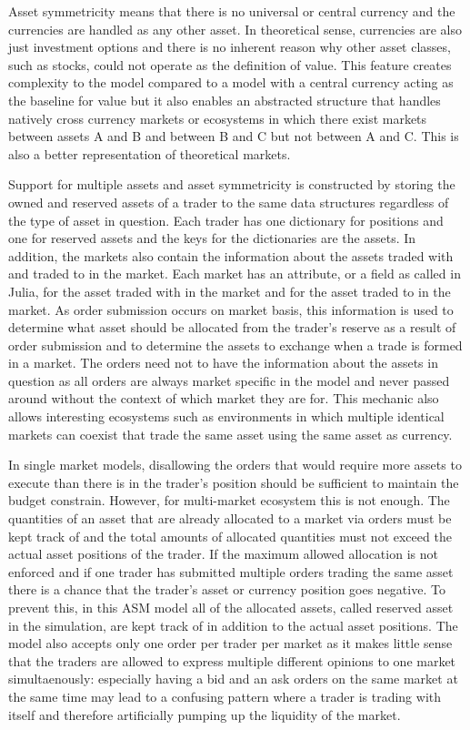 Asset symmetricity means that there is no universal or central currency 
and the currencies are handled as any other asset. In theoretical sense, 
currencies are also just investment options and there is no inherent reason why other 
asset classes, such as stocks, could not operate as the definition 
of value. This feature creates complexity to the model compared to a model
with a central currency acting as the baseline for value but it also enables an
abstracted structure that handles natively cross currency
markets or ecosystems in which there exist markets between assets A and 
B and between B and C but not between A and C. This is also a better 
representation of theoretical markets.

Support for multiple assets and asset symmetricity is constructed by storing 
the owned and reserved assets of a trader to the same data structures regardless
of the type of asset in question. Each trader has one dictionary for positions 
and one for reserved assets and the keys for the dictionaries are the assets. 
In addition, the markets also contain the information about the assets traded with and traded to 
in the market. Each market has an attribute, or a field as called
in Julia, for the asset traded with in the market and for the asset
traded to in the market. As order submission occurs on market basis, this information
is used to determine what asset should be allocated from the trader's reserve as a result of 
order submission and to determine the assets to exchange when a trade is formed in a market. 
The orders need not to have the information about the assets in question as all orders are always
market specific in the model and never passed around without the context of which market they are 
for. This mechanic also allows interesting ecosystems such as environments
in which multiple identical markets can coexist that trade the same asset using the same asset as
currency. 

In single market models, disallowing the orders that would require more assets to execute
than there is in the trader's position should be sufficient to maintain the budget constrain. 
However, for multi-market ecosystem this is not enough. The quantities of an asset 
that are already allocated to a market via orders must be kept track of and the total amounts of 
allocated quantities must not exceed the actual asset positions of the trader. If the maximum allowed 
allocation is not enforced and if one trader has submitted multiple orders trading the same asset
there is a chance that the trader's asset or currency position goes negative. 
To prevent this, in this ASM model all of the allocated assets, called reserved asset 
in the simulation, are kept track of in addition to the actual asset positions. The model also
accepts only one order per trader per market as it makes little sense that
the traders are allowed to express multiple different opinions to one market 
simultaenously: especially having a bid and an ask orders on the same market
at the same time may lead to a confusing pattern where a trader is trading with
itself and therefore artificially pumping up the liquidity of the market. 

